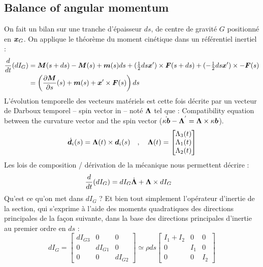\subsection{Balance of angular momentum}
On fait un bilan sur une tranche d'épaisseur $ds$, de centre de gravité $G$ positionné en $\boldsymbol{x}_G$. On applique le théorème du moment cinétique dans un référentiel inertiel :
\begin{equation}
	\begin{aligned}
		\frac{d}{dt}(dI_G) &=
		\boldsymbol{M}(s+ds)-\boldsymbol{M}(s) + \boldsymbol{m}(s)ds
		+ (\tfrac{1}{2}ds\boldsymbol{x}')\times \boldsymbol{F}(s+ds) + (-\tfrac{1}{2}ds\boldsymbol{x}')\times -\boldsymbol{F}(s)\\
		&= \left(\frac{\partial \boldsymbol{M}}{\partial s}(s)+\boldsymbol{m}(s) + \boldsymbol{x}'\times \boldsymbol{F}(s)\right)ds
	\end{aligned}
\end{equation}
L'évolution temporelle des vecteurs matériels est cette fois décrite par un vecteur de Darboux temporel -- spin vector in \cite{Coleman1993} -- noté $\boldsymbol{\Lambda}$ tel que :
Compatibility equation between the curvature vector and the spin vector ($\dot{\kappa\boldsymbol{b}} - \boldsymbol{\Lambda}^{'} = \boldsymbol{\Lambda} \times \kappa\boldsymbol{b}$).
\begin{equation}
	\dot{\boldsymbol{d}_{i}}(s) =\boldsymbol{\Lambda}(t) \times \boldsymbol{d}_i(s)	\quad,\quad
	\boldsymbol{\Lambda}(t)
	=
	\begin{bmatrix}
		\Lambda_3(t) \\
		\Lambda_1(t) \\
		\Lambda_2(t)
	\end{bmatrix}
\end{equation}
Les lois de composition / dérivation de la mécanique nous permettent décrire :
\begin{equation}
	\begin{aligned}
		\frac{d}{dt}(dI_G) &= dI_G\dot{\boldsymbol{\Lambda}} + \boldsymbol{\Lambda}\times dI_G
	\end{aligned}
\end{equation}
Qu'est ce qu'on met dans $dI_G$ ? Et bien tout simplement l'opérateur d'inertie de la section, qui s'exprime à l'aide des moments quadratiques des directions principales de la façon suivante, dans la base des directions principales d'inertie au premier ordre en $ds$ :
\begin{equation}
	dI_G =
	 \begin{bmatrix}
			dI_{G3} & 0 & 0 \\
			0 & dI_{G1} & 0 \\
			0 & 0 & dI_{G2}
	\end{bmatrix}
	\simeq \rho ds
		\begin{bmatrix}
			I_1 + I_2 & 0 & 0 \\
			0 & I_1 & 0 \\
			0 & 0 & I_2
		\end{bmatrix}
\end{equation}
